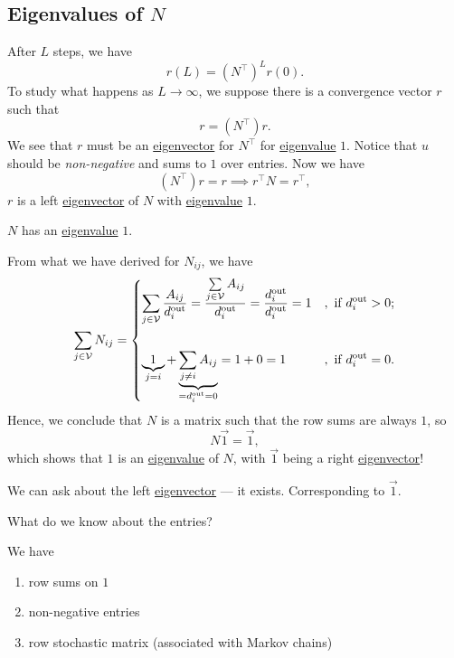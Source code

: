 \subsection{Eigenvalues of \(N\)}
After \(L\) steps, we have
\[
	r(L) = (N^{\top})^L r(0).
\]
To study what happens as \(L\to \infty\), we suppose there is a convergence vector \(r\) such that
\[
	r = (N^{\top})r.
\]
We see that \(r\) must be an \hyperref[def:eigenvector]{eigenvector} for \(N^{\top}\) for \hyperref[def:eigenvalue]{eigenvalue} \(1\). Notice that \(u\) should be
\emph{non-negative} and sums to \(1\) over entries. Now we have
\[
	(N^{\top})r = r \implies r^{\top}N = r^{\top},
\]
\(r\) is a left \hyperref[def:eigenvector]{eigenvector} of \(N\) with \hyperref[def:eigenvalue]{eigenvalue} \(1\).
\begin{note}
	\(N\) has an \hyperref[def:eigenvalue]{eigenvalue} \(1\).
\end{note}
\begin{explanation}
	From what we have derived for \(N_{ij} \), we have
	\[
		\sum\limits_{j\in\mathcal{V}}N_{ij} = \begin{dcases}
			\sum\limits_{j\in\mathcal{V}} \frac{A_{ij}}{d_{i}^{\text{out}}} = \frac{\sum\limits_{j\in\mathcal{V}} A_{ij} }{d_{i}^{\text{out}}} = \frac{d_{i}^{\text{out}}}{d_{i}^{\text{out}}}= 1 & , \text{ if }d_{i}^{\text{out}} > 0; \\\\
			\underbrace{1}_{j = i} + \underbrace{\sum\limits_{j\neq i} A_{ij}}_{ = d_{i}^{\text{out}} = 0} = 1 + 0 = 1                                                                            & , \text{ if }d_{i}^{\text{out}} = 0. \\
		\end{dcases}
	\]
	Hence, we conclude that \(N\) is a matrix such that the row sums are always \(1\), so
	\[
		N \vec{1} = \vec{1},
	\]
	which shows that \(1\) is an \hyperref[def:eigenvalue]{eigenvalue} of \(N\), with \(\vec{1}\) being a right \hyperref[def:eigenvector]{eigenvector}!
\end{explanation}

We can ask about the left \hyperref[def:eigenvector]{eigenvector} — it exists. Corresponding to \(\vec{1}\).
\begin{problem}
What do we know about the entries?
\end{problem}
\begin{answer}
	We have
	\begin{enumerate}
		\item row sums on \(1\)
		\item non-negative entries
		\item row stochastic matrix (associated with Markov chains)
	\end{enumerate}
\end{answer}

